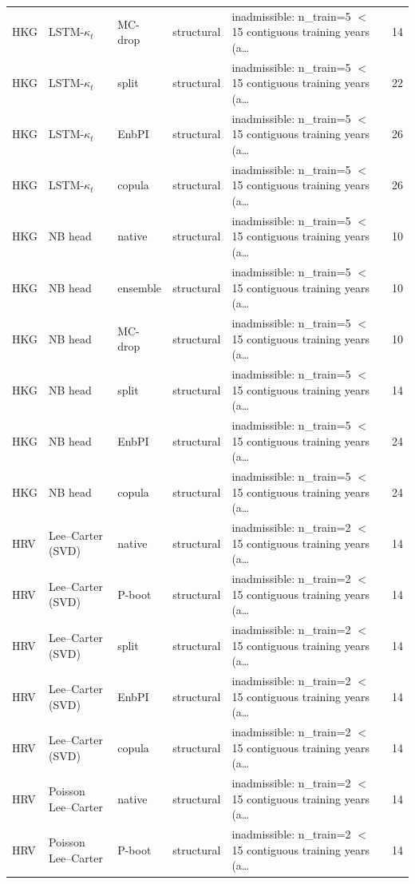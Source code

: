 {\begin{longtable}{@{}lllp{1.6cm}p{6.2cm}r@{}}
HKG & LSTM-$\kappa_t$ & MC-drop & structural & inadmissible: n\_train=5 $<$ 15 contiguous training years (a\ldots & 14 \\
HKG & LSTM-$\kappa_t$ & split & structural & inadmissible: n\_train=5 $<$ 15 contiguous training years (a\ldots & 22 \\
HKG & LSTM-$\kappa_t$ & EnbPI & structural & inadmissible: n\_train=5 $<$ 15 contiguous training years (a\ldots & 26 \\
HKG & LSTM-$\kappa_t$ & copula & structural & inadmissible: n\_train=5 $<$ 15 contiguous training years (a\ldots & 26 \\
HKG & NB head & native & structural & inadmissible: n\_train=5 $<$ 15 contiguous training years (a\ldots & 10 \\
HKG & NB head & ensemble & structural & inadmissible: n\_train=5 $<$ 15 contiguous training years (a\ldots & 10 \\
HKG & NB head & MC-drop & structural & inadmissible: n\_train=5 $<$ 15 contiguous training years (a\ldots & 10 \\
HKG & NB head & split & structural & inadmissible: n\_train=5 $<$ 15 contiguous training years (a\ldots & 14 \\
HKG & NB head & EnbPI & structural & inadmissible: n\_train=5 $<$ 15 contiguous training years (a\ldots & 24 \\
HKG & NB head & copula & structural & inadmissible: n\_train=5 $<$ 15 contiguous training years (a\ldots & 24 \\
HRV & Lee--Carter (SVD) & native & structural & inadmissible: n\_train=2 $<$ 15 contiguous training years (a\ldots & 14 \\
HRV & Lee--Carter (SVD) & P-boot & structural & inadmissible: n\_train=2 $<$ 15 contiguous training years (a\ldots & 14 \\
HRV & Lee--Carter (SVD) & split & structural & inadmissible: n\_train=2 $<$ 15 contiguous training years (a\ldots & 14 \\
HRV & Lee--Carter (SVD) & EnbPI & structural & inadmissible: n\_train=2 $<$ 15 contiguous training years (a\ldots & 14 \\
HRV & Lee--Carter (SVD) & copula & structural & inadmissible: n\_train=2 $<$ 15 contiguous training years (a\ldots & 14 \\
HRV & Poisson Lee--Carter & native & structural & inadmissible: n\_train=2 $<$ 15 contiguous training years (a\ldots & 14 \\
HRV & Poisson Lee--Carter & P-boot & structural & inadmissible: n\_train=2 $<$ 15 contiguous training years (a\ldots & 14 \\

\end{longtable}}
